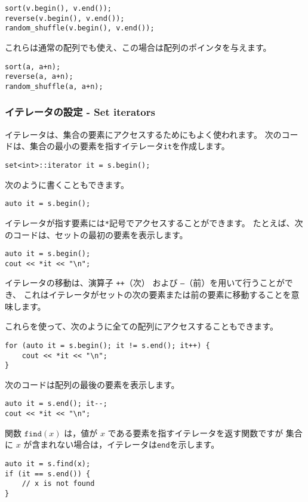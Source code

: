 \begin{lstlisting}
sort(v.begin(), v.end());
reverse(v.begin(), v.end());
random_shuffle(v.begin(), v.end());
\end{lstlisting}

これらは通常の配列でも使え、この場合は配列のポインタを与えます。

\newpage
\begin{lstlisting}
sort(a, a+n);
reverse(a, a+n);
random_shuffle(a, a+n);
\end{lstlisting}

\subsubsection{イテレータの設定 - Set iterators}

イテレータは、集合の要素にアクセスするためにもよく使われます。
次のコードは、集合の最小の要素を指すイテレータ\texttt{it}を作成します。
\begin{lstlisting}
set<int>::iterator it = s.begin();
\end{lstlisting}

次のように書くこともできます。
\begin{lstlisting}
auto it = s.begin();
\end{lstlisting}

イテレータが指す要素には\texttt{*}記号でアクセスすることができます。
たとえば、次のコードは、セットの最初の要素を表示します。
\begin{lstlisting}
auto it = s.begin();
cout << *it << "\n";
\end{lstlisting}

イテレータの移動は、演算子 \texttt{++}（次）
および \texttt{--}（前）を用いて行うことができ、
これはイテレータがセットの次の要素または前の要素に移動することを意味します。

これらを使って、次のように全ての配列にアクセスすることもできます。
\begin{lstlisting}
for (auto it = s.begin(); it != s.end(); it++) {
    cout << *it << "\n";
}
\end{lstlisting}

次のコードは配列の最後の要素を表示します。
\begin{lstlisting}
auto it = s.end(); it--;
cout << *it << "\n";
\end{lstlisting}

関数 $\texttt{find}(x)$ は，値が $x$ である要素を指すイテレータを返す関数ですが
集合に $x$ が含まれない場合は，イテレータは\texttt{end}を示します。
\begin{lstlisting}
auto it = s.find(x);
if (it == s.end()) {
    // x is not found
}
\end{lstlisting}


